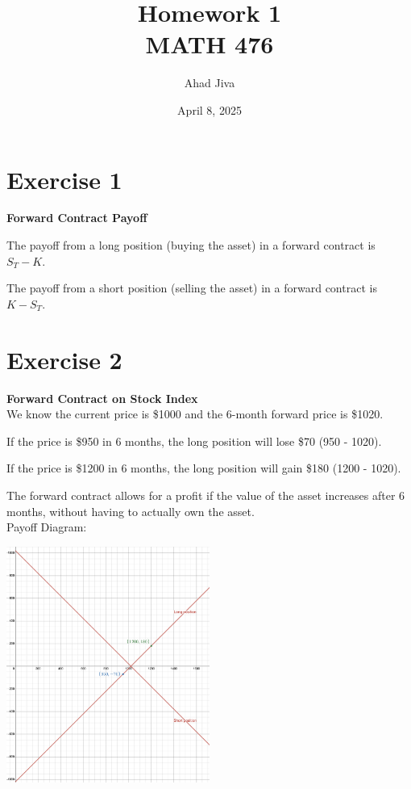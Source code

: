 \documentclass{article}
\title{Homework 1 \\ \large MATH 476}
\author{Ahad Jiva}
\date{April 8, 2025}
\begin{document}
\maketitle
\section*{Exercise 1} 
\begin{flushleft}
    \textbf{Forward Contract Payoff}
    \begin{list}{}
        \item The payoff from a long position (buying the asset) in a forward contract is $S_T - K$.
        \item The payoff from a short position (selling the asset) in a forward contract is $K - S_T$.
    \end{list}
\end{flushleft}
\section*{Exercise 2}
\begin{flushleft}
    \textbf{Forward Contract on Stock Index} \\
    We know the current price is \$1000 and the 6-month forward price is \$1020.
    \begin{list}{}
        \item If the price is \$950 in 6 months, the long position will lose \$70 (950 - 1020).
        \item If the price is \$1200 in 6 months, the long position will gain \$180 (1200 - 1020).        
    \end{list}
    The forward contract allows for a profit if the value of the asset increases after 6 months, without having to actually own the asset.
    \\ Payoff Diagram:
    \begin{center}
        \includegraphics[width=0.5\textwidth]{ex2.png}
    \end{center}
\end{flushleft}
\end{document}
